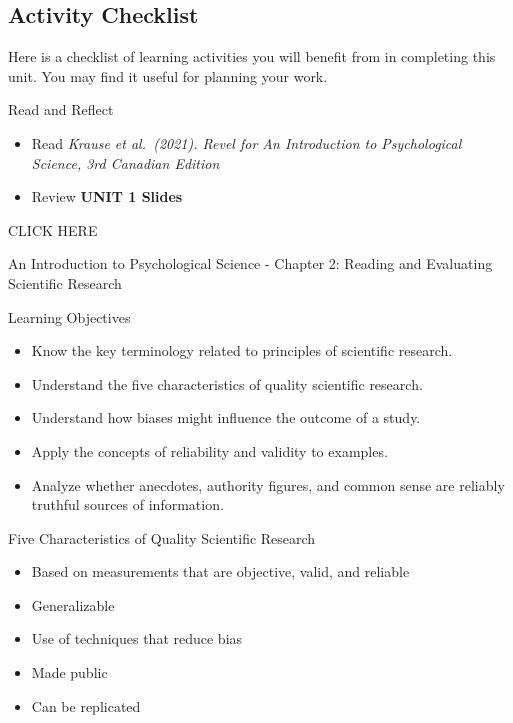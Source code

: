 \documentclass[
]{book}
\providecommand{\tightlist}{%
  \setlength{\itemsep}{0pt}\setlength{\parskip}{0pt}}
\begin{document}
\hypertarget{activity-checklist}{%
\subsection*{Activity Checklist}\label{activity-checklist}}

Here is a checklist of learning activities you will benefit from in completing this unit. You may find it useful for planning your work.

{Read and Reflect}

\begin{itemize}
\tightlist
\item
  Read \emph{Krause et al.~(2021). Revel for An Introduction to Psychological Science, 3rd Canadian Edition}\\
\item
  Review \textbf{UNIT 1 Slides}
\end{itemize}

CLICK HERE

An Introduction to Psychological Science - Chapter 2: Reading and Evaluating Scientific Research

Learning Objectives

\begin{itemize}
\tightlist
\item
  Know the key terminology related to principles of scientific research.\\
\item
  Understand the five characteristics of quality scientific research.\\
\item
  Understand how biases might influence the outcome of a study.\\
\item
  Apply the concepts of reliability and validity to examples.\\
\item
  Analyze whether anecdotes, authority figures, and common sense are reliably truthful sources of information.
\end{itemize}

Five Characteristics of Quality Scientific Research

\begin{itemize}
\tightlist
\item
  Based on measurements that are objective, valid, and reliable\\
\item
  Generalizable\\
\item
  Use of techniques that reduce bias\\
\item
  Made public\\
\item
  Can be replicated
\end{itemize}
\end{document}
